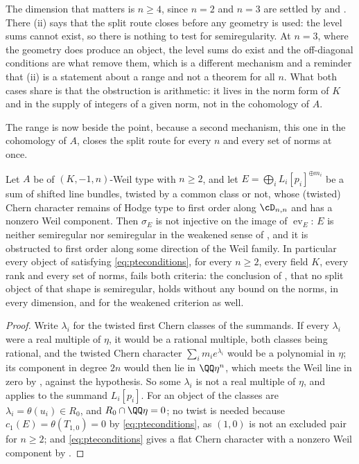 \begin{remark}\label{rem:pterangemeaning}
The dimension that matters is $n\ge4$, since $n=2$ and $n=3$ are settled by
\cite{Mar25a,Mar25b} and \cite{FF26}. There
(ii) says that the split route closes before any geometry
is used: the level sums cannot exist, so there is nothing to test for
semiregularity. At $n=3$, where the geometry does produce an object, the level
sums do exist and the off-diagonal conditions are what remove them, which is a
different mechanism and a reminder that (ii) is a statement about a range and
not a theorem for all $n$. What both cases share is that the obstruction is
arithmetic: it lives in the norm form of $K$ and in the supply of integers of
a given norm, not in the cohomology of $A$.
\end{remark}

The range is now beside the point, because a second mechanism, this one in
the cohomology of $A$, closes the split route for every $n$ and every set of
norms at once.

\begin{corollary}\label{cor:noline}
Let $A$ be of $(K,-1,n)$-Weil type with $n\ge2$, and let
$E=\bigoplus_{i}L_{i}[p_{i}]^{\oplus m_{i}}$ be a sum of shifted line bundles,
twisted by a common class or not, whose (twisted) Chern character remains of
Hodge type to first order along $\cD_{n,n}$ and has a nonzero Weil component.
Then $\sigma_{E}$ is not injective on the image of $\operatorname{ev}_{E}$:
$E$ is neither semiregular nor semiregular in the weakened sense of
\cite[Question 11.4]{Mar25b}, and it is obstructed to first order along some
direction of the Weil family. In particular every object of 
satisfying \eqref{eq:pteconditions}, for every $n\ge2$, every field $K$,
every rank and every set of norms, fails both criteria: the conclusion of
, that no split object of that shape is semiregular, holds
without any bound on the norms, in every dimension, and for the weakened
criterion as well.
\end{corollary}

\begin{proof}
Write $\lambda_{i}$ for the twisted first Chern classes of the summands. If
every $\lambda_{i}$ were a real multiple of $\eta$, it would be a rational
multiple, both classes being rational, and the twisted Chern character
$\sum_{i}m_{i}e^{\lambda_{i}}$ would be a polynomial in $\eta$; its component
in degree $2n$ would then lie in $\QQ\eta^{n}$, which meets the Weil line in
zero by , against the hypothesis. So some $\lambda_{i}$ is
not a real multiple of $\eta$, and  applies to the
summand $L_{i}[p_{i}]$. For an object of  the classes are
$\lambda_{i}=\theta(u_{i})\in R_{0}$, and $R_{0}\cap\QQ\eta=0$; no twist is
needed because $c_{1}(E)=\theta(T_{1,0})=0$ by \eqref{eq:pteconditions}, as
$(1,0)$ is not an excluded pair for $n\ge2$; and \eqref{eq:pteconditions}
gives a flat Chern character with a nonzero Weil component by
.
\end{proof}


